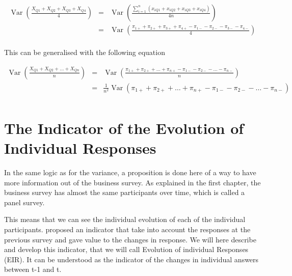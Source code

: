 \documentclass[12pt,a4paper,oneside]{book}
\DeclareMathOperator{\Var}{Var}
\begin{document}
\begin{eqnarray}
    \Var \left(\frac{X_{Q1} + X_{Q2} + X_{Q3} + X_{Q4}}{4} \right) 
    &=& \Var \left(\frac{\sum_{i=1}^n \left(x_{i Q1} + x_{i Q2} + x_{i Q3} + x_{i Q4} \right)}{4n} \right) \nonumber \\
    &=& \Var \left(\frac{\pi_{1+} + \pi_{2+} + \pi_{3+} + \pi_{4+} - \pi_{1-} - \pi_{2-} - \pi_{3-} - \pi_{4-} }{4} \right) \nonumber \\
\end{eqnarray}

This can be generalised with the following equation

\begin{eqnarray}
    \Var \left(\frac{X_{Q1} + X_{Q2} + \ldots + X_{Qn}}{n} \right) 
    &=& \Var \left(\frac{\pi_{1+} + \pi_{2+} + \ldots + \pi_{n+} - \pi_{1-} - \pi_{2-} - \ldots - \pi_{n-} }{n} \right) \nonumber \\
    &=& \frac{1}{n^2} \Var \left(\pi_{1+} + \pi_{2+} + \ldots + \pi_{n+} - \pi_{1-} - \pi_{2-} - \ldots - \pi_{n-} \right) \nonumber \\
\end{eqnarray}

\chapter{The Indicator of the Evolution of Individual Responses}

In the same logic as for the variance, a proposition is done here of a way to have more information out of the business survey. 
As explained in the first chapter, the business survey has almost the same participants over time, which is called a panel survey.


This means that we can see the individual evolution of each of the individual participants. \cite{caron_estimation_1996} proposed an indicator that take into account the responses at the previous survey and gave value to the changes in response.
We will here describe and develop this indicator, that we will call Evolution of individual Responses (EIR).
It can be understood as the indicator of the changes in individual answers between t-1 and t.
\end{document}
